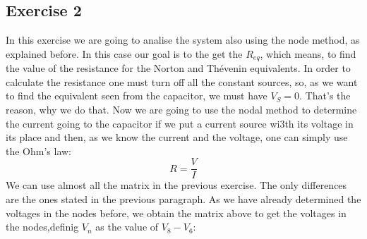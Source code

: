 \subsection{Exercise 2}
In this exercise we are going to analise the system also using the node method, as explained before. In this case our goal is to the get the $R_{eq}$, which means, to find the value of the resistance for the Norton and Thévenin equivalents. In order to calculate the resistance one must turn off all the constant sources, so, as we want to find the equivalent seen from the capacitor, we must have $V_S=0$. That's the reason, why we do that. Now we are going to use the nodal method to determine the current going to the capacitor if we put a current source wi3th its voltage in its place and then, as we know the current and the voltage, one can simply use the Ohm's law:
\begin{equation}
  R=\frac{V}{I}
\end{equation}
We can use almost all the matrix in the previous exercise. The only differences are the ones stated in the previous paragraph. As we have already determined the voltages in the nodes before, we obtain the matrix above to get the voltages in the nodes,definig $V_n$ as the value of $V_8-V_6$:
